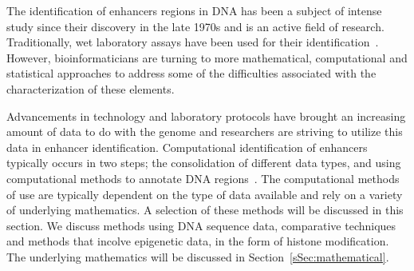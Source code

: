 
        The identification of enhancers regions in DNA has been a subject of intense study since their discovery in the late 1970s and is an active field of research. Traditionally, wet laboratory assays have been used for their identification~\cite{rosenthal198772}. However, bioinformaticians are turning to more mathematical, computational and statistical approaches to address some of the difficulties associated with the characterization of these elements. 
        
        Advancements in technology and laboratory protocols have brought an increasing amount of data to do with the genome and researchers are striving to utilize this data in enhancer identification. Computational identification of enhancers typically occurs in two steps; the consolidation of different data types, and using computational methods to annotate DNA regions~\cite{kleftogiannis2015progress}. The computational methods of use are typically dependent on the type of data available and rely on a variety of underlying mathematics. A selection of these methods will be discussed in this section. We discuss methods using DNA sequence data, comparative techniques and methods that incolve epigenetic data, in the form of histone modification. The underlying mathematics will be discussed in Section~\ref{sSec:mathematical}.
        
        
        

